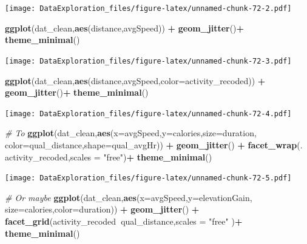 \documentclass[
]{book}
\newenvironment{Shaded}{\begin{snugshade}}{\end{snugshade}}
\newcommand{\CommentTok}[1]{\textcolor[rgb]{0.56,0.35,0.01}{\textit{#1}}}
\newcommand{\DataTypeTok}[1]{\textcolor[rgb]{0.13,0.29,0.53}{#1}}
\newcommand{\KeywordTok}[1]{\textcolor[rgb]{0.13,0.29,0.53}{\textbf{#1}}}
\newcommand{\NormalTok}[1]{#1}
\newcommand{\OperatorTok}[1]{\textcolor[rgb]{0.81,0.36,0.00}{\textbf{#1}}}
\newcommand{\StringTok}[1]{\textcolor[rgb]{0.31,0.60,0.02}{#1}}
\begin{document}
\texttt{[image: DataExploration\_files/figure-latex/unnamed-chunk-72-2.pdf]}

\begin{Shaded}
\begin{Highlighting}[]
\KeywordTok{ggplot}\NormalTok{(dat_clean,}\KeywordTok{aes}\NormalTok{(distance,avgSpeed)) }\OperatorTok{+}\StringTok{ }\KeywordTok{geom_jitter}\NormalTok{()}\OperatorTok{+}
\StringTok{  }\KeywordTok{theme_minimal}\NormalTok{()}
\end{Highlighting}
\end{Shaded}

\texttt{[image: DataExploration\_files/figure-latex/unnamed-chunk-72-3.pdf]}

\begin{Shaded}
\begin{Highlighting}[]
\KeywordTok{ggplot}\NormalTok{(dat_clean,}\KeywordTok{aes}\NormalTok{(distance,avgSpeed,}\DataTypeTok{color=}\NormalTok{activity_recoded))  }\OperatorTok{+}\StringTok{ }
\StringTok{  }\KeywordTok{geom_jitter}\NormalTok{()}\OperatorTok{+}
\StringTok{  }\KeywordTok{theme_minimal}\NormalTok{()}
\end{Highlighting}
\end{Shaded}

\texttt{[image: DataExploration\_files/figure-latex/unnamed-chunk-72-4.pdf]}

\begin{Shaded}
\begin{Highlighting}[]
\CommentTok{# To }
\KeywordTok{ggplot}\NormalTok{(dat_clean,}\KeywordTok{aes}\NormalTok{(}\DataTypeTok{x=}\NormalTok{avgSpeed,}\DataTypeTok{y=}\NormalTok{calories,}\DataTypeTok{size=}\NormalTok{duration,}
                     \DataTypeTok{color=}\NormalTok{qual_distance,}\DataTypeTok{shape=}\NormalTok{qual_avgHr)) }\OperatorTok{+}\StringTok{ }
\StringTok{  }\KeywordTok{geom_jitter}\NormalTok{() }\OperatorTok{+}\StringTok{ }
\StringTok{  }\KeywordTok{facet_wrap}\NormalTok{(.}\OperatorTok{~}\StringTok{ }\NormalTok{activity_recoded,}\DataTypeTok{scales =} \StringTok{"free"}\NormalTok{)}\OperatorTok{+}
\StringTok{  }\KeywordTok{theme_minimal}\NormalTok{()}
\end{Highlighting}
\end{Shaded}

\texttt{[image: DataExploration\_files/figure-latex/unnamed-chunk-72-5.pdf]}

\begin{Shaded}
\begin{Highlighting}[]
\CommentTok{# Or maybe}
\KeywordTok{ggplot}\NormalTok{(dat_clean,}\KeywordTok{aes}\NormalTok{(}\DataTypeTok{x=}\NormalTok{avgSpeed,}\DataTypeTok{y=}\NormalTok{elevationGain,}
                     \DataTypeTok{size=}\NormalTok{calories,}\DataTypeTok{color=}\NormalTok{duration)) }\OperatorTok{+}\StringTok{ }
\StringTok{  }\KeywordTok{geom_jitter}\NormalTok{() }\OperatorTok{+}\StringTok{ }
\StringTok{  }\KeywordTok{facet_grid}\NormalTok{(activity_recoded}\OperatorTok{~}\NormalTok{qual_distance,}\DataTypeTok{scales =} \StringTok{"free"}\NormalTok{ )}\OperatorTok{+}
\StringTok{  }\KeywordTok{theme_minimal}\NormalTok{()}
\end{Highlighting}
\end{Shaded}
\end{document}
